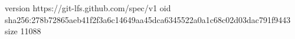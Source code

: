 version https://git-lfs.github.com/spec/v1
oid sha256:278b72865aeb41f2f3a6c14649aa45dca6345522a0a1c68c02d03dac791f9443
size 11088
